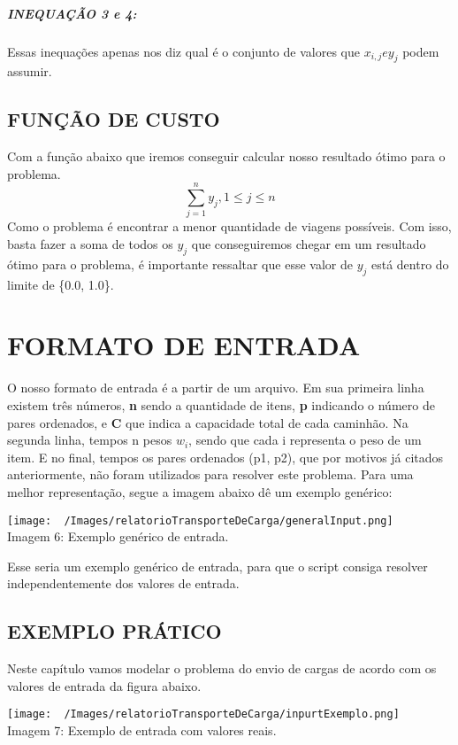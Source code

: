 \paragraph{INEQUAÇÃO 3 e 4:}
Essas inequações apenas nos diz qual é o conjunto de valores que \( x_{i,j} e y_{j} \) podem assumir.

\section{FUNÇÃO DE CUSTO}
  Com a função abaixo que iremos conseguir calcular nosso resultado ótimo para o problema.
  \[\sum_{j=1}^{n}y_{j}, 1 \leq j \leq n\]
  Como o problema é encontrar a menor quantidade de viagens possíveis. Com isso, basta fazer a soma de todos os \(y_{j}\) que conseguiremos chegar em um resultado ótimo para o problema, é importante ressaltar que esse valor de \( y_{j}\) está dentro do limite de \{0.0, 1.0\}.

\chapter{FORMATO DE ENTRADA}
  O nosso formato de entrada é a partir de um arquivo. Em sua primeira linha existem três números, \textbf{n} sendo a quantidade de itens, \textbf{p} indicando o número de pares ordenados, e \textbf{C} que indica a capacidade total de cada caminhão. Na segunda linha, tempos n pesos \textbf{\(w_{i}\)}, sendo que cada i representa o peso de um item. E no final, tempos os pares ordenados (p1, p2), que por motivos já citados anteriormente, não foram utilizados para resolver este problema. Para uma melhor representação, segue a imagem abaixo dê um exemplo genérico:
\begin{center}
  \texttt{[image: ~/Images/relatorioTransporteDeCarga/generalInput.png]}\\
  Imagem 6: Exemplo genérico de entrada.
\end{center}
  Esse seria um exemplo genérico de entrada, para que o script consiga resolver independentemente dos valores de entrada. 
 
  \section{EXEMPLO PRÁTICO}
    Neste capítulo vamos modelar o problema do envio de cargas de acordo com os valores de entrada da figura abaixo.
    \begin{center}
      \texttt{[image: ~/Images/relatorioTransporteDeCarga/inpurtExemplo.png]}\\
      Imagem 7: Exemplo de entrada com valores reais.
    \end{center}

